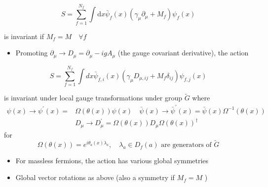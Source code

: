 \begin{equation}
S=\sum_{f=1}^{N_f} \int {\text{d} x} \bar{\psi}_{f}(x)\left(\gamma_{\mu} \partial_{\mu}+M_{f}\right) \psi_{f}(x)
\end{equation}

is invariant if \(M_{f}=M \quad \forall f\)

\begin{itemize}
  \item Promoting \(\partial_{\mu} \rightarrow D_{\mu}=\partial_{\mu}-i g A_{\mu}\) (the gauge covariant derivative), the action
\end{itemize}

\begin{equation}
S=\sum_{f=1}^{N_{f}} \int d x \bar{\psi}_{f, i}(x)\left(\gamma_\mu D_{\mu, i j}+M_{f} \delta_{i j}\right) \psi_{f, j}(x)
\end{equation}

is invariant under local gauge transformations under group $\tilde{G}$ where
\begin{align}
    \psi(x) \rightarrow \psi^\prime(x) =& \Omega(\theta(x)) \psi(x) \quad \bar{\psi}(x) \rightarrow \bar{\psi}^\prime(x) = \bar{\psi}(x)\Omega^{-1}(\theta(x)) \nonumber \\
    &D_\mu \rightarrow D_\mu^\prime = \Omega(\theta(x)) D_\mu \Omega(\theta(x))^\dagger
\end{align}
for
\begin{equation}
    \Omega(\theta(x)) = e^{i \theta_a(x) \lambda_a}, \quad \lambda_a \in D_f(a) \text{ are generators of }\tilde{G}
\end{equation}

\begin{itemize}
  \item For massless fermions, the action has various global symmetries
  \item Global vector rotations as above (also a symmetry if \(M_{f}=M\) )
\end{itemize}

